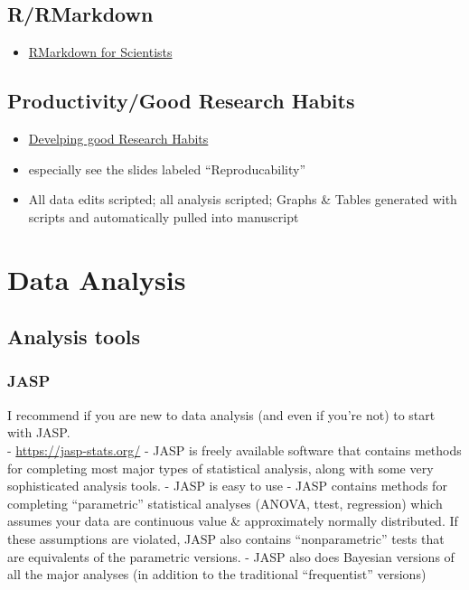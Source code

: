 \documentclass[
]{book}
\providecommand{\tightlist}{%
  \setlength{\itemsep}{0pt}\setlength{\parskip}{0pt}}
\begin{document}
\hypertarget{rrmarkdown}{%
\section{R/RMarkdown}\label{rrmarkdown}}

\begin{itemize}
\tightlist
\item
  \href{https://rmd4sci.njtierney.com/}{RMarkdown for Scientists}
\end{itemize}

\hypertarget{productivitygood-research-habits}{%
\section{Productivity/Good Research Habits}\label{productivitygood-research-habits}}

\begin{itemize}
\tightlist
\item
  \href{file:///C:/Users/bohil/Downloads/ResearchHabits.pdf}{Develping good Research Habits}
\item
  especially see the slides labeled ``Reproducability''
\item
  All data edits scripted; all analysis scripted; Graphs \& Tables generated with scripts and automatically pulled into manuscript
\end{itemize}

\hypertarget{intro}{%
\chapter{Data Analysis}\label{intro}}

\hypertarget{analysis-tools}{%
\section{Analysis tools}\label{analysis-tools}}

\hypertarget{jasp}{%
\subsection{JASP}\label{jasp}}

I recommend if you are new to data analysis (and even if you're not) to start with JASP.\\
- \url{https://jasp-stats.org/}
- JASP is freely available software that contains methods for completing most major types of statistical analysis, along with some very sophisticated analysis tools.
- JASP is easy to use
- JASP contains methods for completing ``parametric'' statistical analyses (ANOVA, ttest, regression) which assumes your data are continuous value \& approximately normally distributed. If these assumptions are violated, JASP also contains ``nonparametric'' tests that are equivalents of the parametric versions.
- JASP also does Bayesian versions of all the major analyses (in addition to the traditional ``frequentist'' versions)
\end{document}
